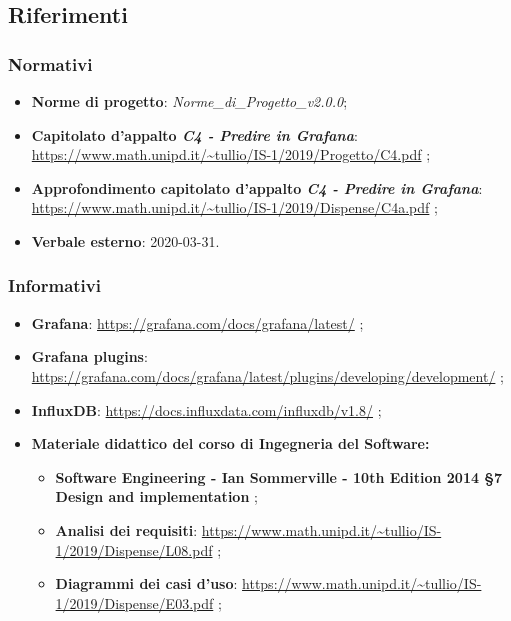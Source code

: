 \subsection{Riferimenti}
		\subsubsection{Normativi}
			\begin{itemize}
				\item \textbf{Norme di progetto}: \emph{Norme\_di\_Progetto\_v2.0.0};
				\item \textbf{Capitolato d'appalto \emph{C4 - Predire in Grafana}}: \url{https://www.math.unipd.it/~tullio/IS-1/2019/Progetto/C4.pdf} ;
				\item \textbf{Approfondimento capitolato d'appalto \emph{C4 - Predire in Grafana}}: \url{https://www.math.unipd.it/~tullio/IS-1/2019/Dispense/C4a.pdf} ;
				\item \textbf{Verbale esterno}: 2020-03-31. 
			\end{itemize}
		
		\subsubsection{Informativi}
			\begin{itemize}
			\item \textbf{Grafana}: \url{https://grafana.com/docs/grafana/latest/} ;
			\item \textbf{Grafana plugins}: \url{https://grafana.com/docs/grafana/latest/plugins/developing/development/} ;
			\item \textbf{InfluxDB}: \url{https://docs.influxdata.com/influxdb/v1.8/} ;

			\item \textbf{Materiale didattico del corso di Ingegneria del Software:}
			\begin{itemize}
				\item \textbf{Software Engineering - Ian Sommerville - 10th Edition 2014 \S7 Design and implementation} ;
				\item \textbf{Analisi dei requisiti}: \url{https://www.math.unipd.it/~tullio/IS-1/2019/Dispense/L08.pdf} ;				\item \textbf{Diagrammi dei casi d'uso}: \url{https://www.math.unipd.it/~tullio/IS-1/2019/Dispense/E03.pdf} ;
					
				\end{itemize}
			\end{itemize}				